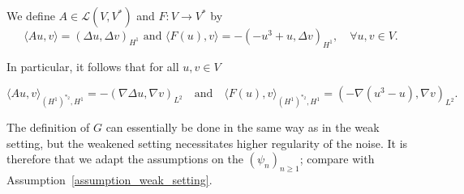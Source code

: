 \documentclass[reqno]{amsart}
\newcommand{\sL}{\mathscr{L}}
\newcommand{\1}{\mathbf{1}}
\newcommand{\grad}{\nabla}
\begin{document}
We define $A \in \sL(V,V^\ast)$ and $F:V\to V^\ast$ by
\begin{equation}\label{def_weakened_Bilaplacian}
    \langle Au,v \rangle=(\Delta u, \Delta v)_{H^1} \text{ and } 
\langle F(u),v \rangle=-(- u^3+u, \Delta v)_{H^1}, \quad \forall u, v \in V.
\end{equation}

In particular, it follows that for all $u, v \in V$

\begin{equation}
    \langle Au, v\rangle_{(H^1)^{\ast_2}, H^1} = -(\grad \Delta u,\grad v)_{L^2} \quad \text{and} \quad \langle F(u),v\rangle_{(H^1)^{\ast_2},H^1} = (-\grad(u^3 - u) ,\grad v)_{L^2}.
\end{equation}

The definition of $G$ can essentially be done in the same way as in the weak setting, but the weakened setting necessitates
higher regularity of the noise. It is therefore that we adapt the assumptions on the $(\psi_n)_{n\geq 1}$; compare with Assumption~\ref{assumption_weak_setting}.
\end{document}
